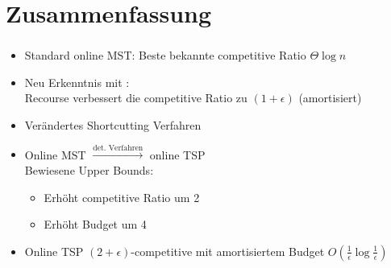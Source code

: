 \section{Zusammenfassung}

\begin{frame}
	\frametitle{\insertsection}
	\begin{itemize}
		\itemsep\setlength{1em}
		\item Standard online MST: Beste bekannte competitive Ratio $\Theta{\log n}$
		\item Neu Erkenntnis mit \cite{recourse2016}:\\Recourse verbessert die competitive Ratio zu \underline{$(1+\epsilon)$} (amortisiert)
		\item Verändertes Shortcutting Verfahren
		\item Online MST $\xrightarrow{\text{det. Verfahren}}$ online TSP\\
		Bewiesene Upper Bounds:
		\vspace{1em}
		\begin{itemize}
			\itemsep\setlength{.7em}
			\item Erhöht competitive Ratio um 2
			\item Erhöht Budget um 4
		\end{itemize}
		\item Online TSP $(2+\epsilon)$-competitive mit amortisiertem Budget $O(\frac{1}{\epsilon}\log\frac{1}{\epsilon})$
	\end{itemize}
\end{frame}
